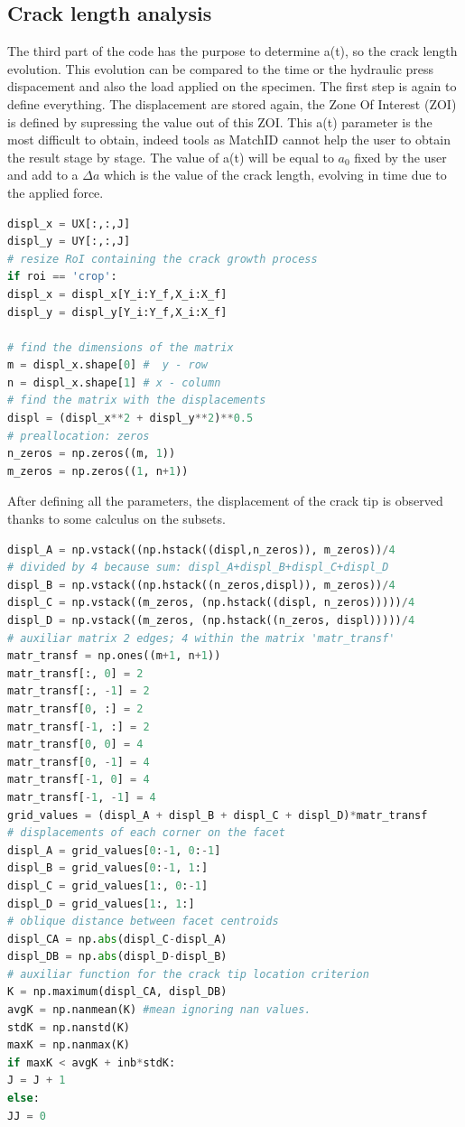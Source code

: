
\subsection{Crack length analysis}

The third part of the code has the purpose to determine a(t), so the crack length evolution. This evolution can be compared to the time or the hydraulic press dispacement and also the load applied on the specimen. The first step is again to define everything. The displacement are stored again, the Zone Of Interest (ZOI) is defined by supressing the value out of this ZOI.
This a(t) parameter is the most difficult to obtain, indeed tools as MatchID cannot help the user to obtain the result stage by stage. The value of a(t) will be equal to $a_{0}$ fixed by the user and add to a $\Delta a$ which is the value of the crack length, evolving in time due to the applied force.

\begin{lstlisting}[language=Python]
displ_x = UX[:,:,J]
displ_y = UY[:,:,J]
# resize RoI containing the crack growth process
if roi == 'crop':
displ_x = displ_x[Y_i:Y_f,X_i:X_f]
displ_y = displ_y[Y_i:Y_f,X_i:X_f]

# find the dimensions of the matrix
m = displ_x.shape[0] #  y - row
n = displ_x.shape[1] # x - column
# find the matrix with the displacements
displ = (displ_x**2 + displ_y**2)**0.5
# preallocation: zeros
n_zeros = np.zeros((m, 1))
m_zeros = np.zeros((1, n+1))
\end{lstlisting}

After defining all the parameters, the displacement of the crack tip is observed thanks to some calculus on the subsets. 

\begin{lstlisting}[language=Python]
displ_A = np.vstack((np.hstack((displ,n_zeros)), m_zeros))/4
# divided by 4 because sum: displ_A+displ_B+displ_C+displ_D
displ_B = np.vstack((np.hstack((n_zeros,displ)), m_zeros))/4
displ_C = np.vstack((m_zeros, (np.hstack((displ, n_zeros)))))/4
displ_D = np.vstack((m_zeros, (np.hstack((n_zeros, displ)))))/4
# auxiliar matrix 2 edges; 4 within the matrix 'matr_transf'
matr_transf = np.ones((m+1, n+1))
matr_transf[:, 0] = 2
matr_transf[:, -1] = 2
matr_transf[0, :] = 2
matr_transf[-1, :] = 2
matr_transf[0, 0] = 4
matr_transf[0, -1] = 4
matr_transf[-1, 0] = 4
matr_transf[-1, -1] = 4
grid_values = (displ_A + displ_B + displ_C + displ_D)*matr_transf
# displacements of each corner on the facet
displ_A = grid_values[0:-1, 0:-1]
displ_B = grid_values[0:-1, 1:]
displ_C = grid_values[1:, 0:-1]
displ_D = grid_values[1:, 1:]
# oblique distance between facet centroids
displ_CA = np.abs(displ_C-displ_A)
displ_DB = np.abs(displ_D-displ_B)
# auxiliar function for the crack tip location criterion
K = np.maximum(displ_CA, displ_DB)
avgK = np.nanmean(K) #mean ignoring nan values.
stdK = np.nanstd(K)
maxK = np.nanmax(K)
if maxK < avgK + inb*stdK:
J = J + 1
else:
JJ = 0
\end{lstlisting}

